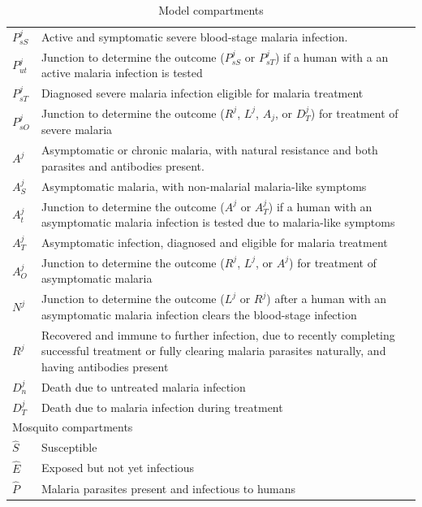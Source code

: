 \documentclass[doublespacing]{bmcart}
\begin{document}
{\begin{table}
\begin{center}
\begin{tabular}{p{}p{}}
$P_{sS}^j$ & Active and symptomatic severe blood-stage malaria infection. \\
$P_{ut}^j$ & Junction to determine the outcome ($P_{sS}^j$ or $P_{sT}^j$) if a human with a an active malaria infection is tested \\
$P_{sT}^j$ & Diagnosed severe malaria infection eligible for malaria treatment \\
$P_{sO}^j$ & Junction to determine the outcome ($R^j$, $L^j$, $A_j$, or $D_T^j$) for treatment of severe malaria \\

$A^j$ & Asymptomatic or chronic malaria, with natural resistance and both parasites and antibodies present. \\
$A_S^j$ & Asymptomatic malaria, with non-malarial malaria-like symptoms \\
$A_t^j$ & Junction to determine the outcome ($A^j$ or $A_T^j$) if a human with an asymptomatic malaria infection is tested due to malaria-like symptoms \\
$A_T^j$ & Asymptomatic infection, diagnosed and eligible for malaria treatment \\
$A_O^j$ & Junction to determine the outcome ($R^j$,  $L^j$, or $A^j$) for treatment of asymptomatic malaria \\

$N^j$ & Junction to determine the outcome ($L^j$ or $R^j$) after a human with an asymptomatic malaria infection clears the blood-stage infection \\

$R^j$ & Recovered and immune to further infection, due to recently completing successful treatment or fully clearing malaria parasites naturally, and having antibodies present \\

$D_n^j$ & Death due to untreated malaria infection \\

$D_T^j$ & Death due to malaria infection during treatment \\

\hline
\multicolumn{2}{l}{Mosquito compartments} \\
\hline
$\hat{S}$ & Susceptible \\
$\hat{E}$ & Exposed but not yet infectious \\
$\hat{P}$ & Malaria parasites present and infectious to humans \\
\end{tabular}
\end{center}
\caption{Model compartments}\label{tab:model_compartments}
\end{table}
}
\end{document}
